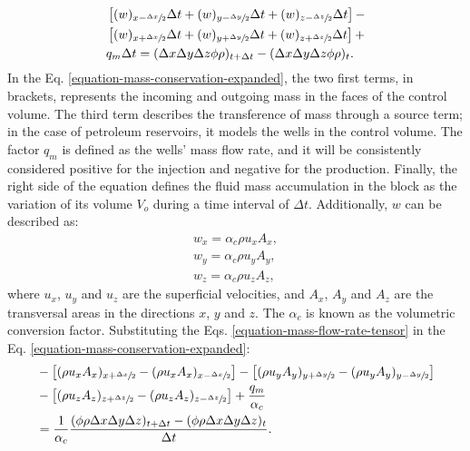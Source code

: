 %
\begin{align}
	\label{equation-mass-conservation-expanded}
	\nonumber & \left[ (w)_{x-\sfrac{\Delta x}{2}}\Delta t+ (w)_{y-\sfrac{\Delta y}{2}}\Delta t + (w)_{z-\sfrac{\Delta z}{2}}\Delta t \right] - \\
	\nonumber & \left[ (w)_{x+\sfrac{\Delta x}{2}}\Delta t+ (w)_{y+\sfrac{\Delta y}{2}}\Delta t + (w)_{z+\sfrac{\Delta z}{2}}\Delta t \right] + \\
	&  q_m \Delta t = (\Delta x \Delta y \Delta z \phi \rho)_{t+\Delta t} - (\Delta x \Delta y \Delta z \phi \rho)_{t} .
\end{align}
%
In the Eq. \ref{equation-mass-conservation-expanded}, the two first terms, in brackets, represents the incoming and outgoing mass in the faces of the control volume.
%
The third term describes the transference of mass through a source term; in the case of petroleum reservoirs, it models the wells in the control volume.
%
The factor $q_m$ is defined as the wells' mass flow rate, and it will be consistently considered positive for the injection and negative for the production.
%
Finally, the right side of the equation defines the fluid mass accumulation in the block as the variation of its volume $V_o$ during a time interval of $\Delta t$.
%
Additionally, $w$ can be described as:
%
%
\begin{align}
	\label{equation-mass-flow-rate-tensor} \nonumber
	w_x= \alpha_c \rho u_x A_x, \\ \nonumber
	w_y= \alpha_c \rho u_y A_y,  \\
	w_z= \alpha_c \rho u_z A_z,
\end{align}
%
where $u_x$, $u_y$ and $u_z$  are the superficial velocities, and  $A_x$, $A_y$ and $A_z$ are the transversal areas in the directions $x$, $y$ and $z$.
%
The $\alpha_c$ is known as the volumetric conversion factor.
%
Substituting the Eqs. \ref{equation-mass-flow-rate-tensor} in the Eq. \ref{equation-mass-conservation-expanded}:
%
\begin{align}\nonumber
	\label{equation-mass-flow-rate-with-superficial-velocities}
	& -\left[(\rho u_x A_x)_{x+\sfrac{\Delta x}{2}}-(\rho u_x A_x)_{x-\sfrac{\Delta x}{2}} \right]
	-\left[(\rho u_y A_y)_{y+\sfrac{\Delta y}{2}}-(\rho u_y A_y)_{y-\sfrac{\Delta y}{2}}\right] \\ \nonumber
	& -\left[(\rho u_z A_z)_{z+\sfrac{\Delta z}{2}}-(\rho u_z A_z)_{z-\sfrac{\Delta z}{2}}\right]
	+ \frac{q_m}{\alpha_c} \\
	& = \frac{1}{\alpha_c}\frac{(\phi \rho \Delta x \Delta y \Delta z)_{t+\Delta t}-(\phi \rho \Delta x \Delta y \Delta z)_{t}}{\Delta t} .
\end{align}
